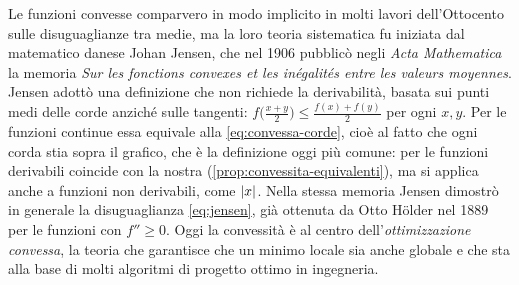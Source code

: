 \begin{notastorica}
Le funzioni convesse comparvero in modo implicito in molti lavori dell'Ottocento sulle
disuguaglianze tra medie, ma la loro teoria sistematica fu iniziata dal matematico
danese Johan Jensen, che nel 1906 pubblicò negli \emph{Acta Mathematica} la memoria
\emph{Sur les fonctions convexes et les inégalités entre les valeurs moyennes}. Jensen
adottò una definizione che non richiede la derivabilità, basata sui punti medi delle
corde anziché sulle tangenti: $f\bigl(\frac{x+y}2\bigr)\le\frac{f(x)+f(y)}2$ per ogni $x,y$.
Per le funzioni continue essa equivale alla \eqref{eq:convessa-corde}, cioè al fatto che
ogni corda stia sopra il grafico, che è la definizione oggi più comune: per le funzioni
derivabili coincide con la nostra (\cref{prop:convessita-equivalenti}), ma si applica
anche a funzioni non derivabili, come $\lvert x\rvert$. Nella stessa memoria Jensen dimostrò in
generale la disuguaglianza \eqref{eq:jensen}, già ottenuta da Otto Hölder nel 1889 per
le funzioni con $f''\ge0$. Oggi la convessità è al centro dell'\emph{ottimizzazione
convessa}, la teoria che garantisce che un minimo locale sia anche globale e che sta
alla base di molti algoritmi di progetto ottimo in ingegneria.
\end{notastorica}

